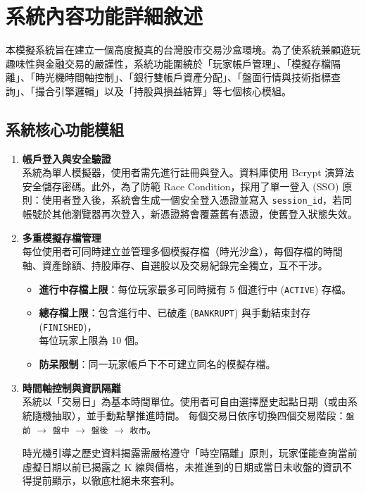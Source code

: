 \documentclass[UTF8, a4paper, 12pt, fontset=none]{ctexart}
\begin{document}
    \section{系統內容功能詳細敘述}
    
    本模擬系統旨在建立一個高度擬真的台灣股市交易沙盒環境。為了使系統兼顧遊玩趣味性與金融交易的嚴謹性，系統功能圍繞於「玩家帳戶管理」、「模擬存檔隔離」、「時光機時間軸控制」、「銀行雙帳戶資產分配」、「盤面行情與技術指標查詢」、「撮合引擎邏輯」以及「持股與損益結算」等七個核心模組。

    \subsection{系統核心功能模組}
    \begin{enumerate}
        \item \textbf{帳戶登入與安全驗證}\\
        系統為單人模擬器，使用者需先進行註冊與登入。資料庫使用 Bcrypt 演算法安全儲存密碼。此外，為了防範 Race Condition，採用了單一登入 (SSO) 原則：使用者登入後，系統會生成一個安全登入憑證並寫入 \texttt{session\_id}，若同帳號於其他瀏覽器再次登入，新憑證將會覆蓋舊有憑證，使舊登入狀態失效。
        
        \item \textbf{多重模擬存檔管理} \\       
        每位使用者可同時建立並管理多個模擬存檔（時光沙盒），每個存檔的時間軸、資產餘額、持股庫存、自選股以及交易紀錄完全獨立，互不干涉。
        \begin{itemize}
            \item \textbf{進行中存檔上限}：每位玩家最多可同時擁有 5 個進行中 (\texttt{ACTIVE}) 存檔。
            \item \textbf{總存檔上限}：包含進行中、已破產 (\texttt{BANKRUPT}) 與手動結束封存 (\texttt{FINISHED})，\\每位玩家上限為 10 個。
            \item \textbf{防呆限制}：同一玩家帳戶下不可建立同名的模擬存檔。
        \end{itemize}

        \item \textbf{時間軸控制與資訊隔離}\\
        系統以「交易日」為基本時間單位。使用者可自由選擇歷史起點日期（或由系統隨機抽取），並手動點擊推進時間。
        每個交易日依序切換四個交易階段：\texttt{盤前} $\to$ \texttt{盤中} $\to$ \texttt{盤後} $\to$ \texttt{收市}。
        
        時光機引導之歷史資料揭露需嚴格遵守「時空隔離」原則，玩家僅能查詢當前虛擬日期以前已揭露之 K 線與價格，未推進到的日期或當日未收盤的資訊不得提前顯示，以徹底杜絕未來套利。


\end{enumerate}
\end{document}

